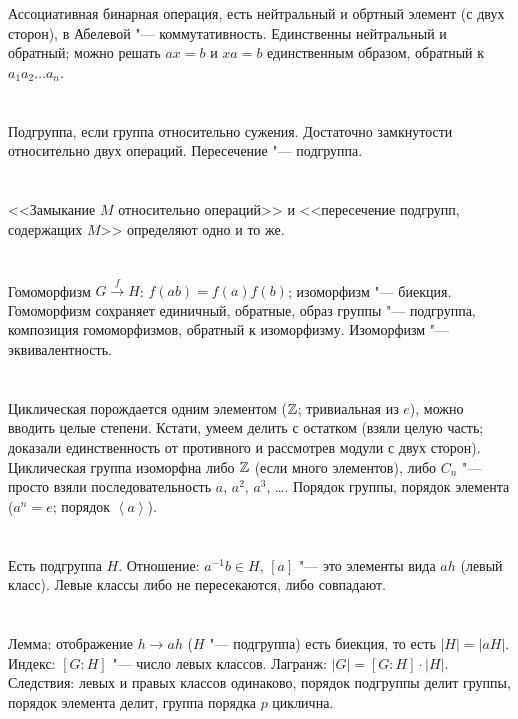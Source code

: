 \section{} %
Ассоциативная бинарная операция, есть нейтральный и обртный элемент (с двух сторон), в Абелевой "--- коммутативность.
Единственны нейтральный и обратный; можно решать $ax=b$ и $xa=b$ единственным образом, обратный к $a_1a_2\dots a_n$.

\section{} %
Подгруппа, если группа относительно сужения. Достаточно замкнутости относительно двух операций. Пересечение "--- подгруппа.

\section{} %
<<Замыкание $M$ относительно операций>> и <<пересечение подгрупп, содержащих $M$>> определяют одно и то же.

\section{} %
Гомоморфизм $G \xrightarrow{f} H$: $f(ab)=f(a)f(b)$; изоморфизм "--- биекция. Гомоморфизм сохраняет единичный, обратные,
образ группы "--- подгруппа, композиция гомоморфизмов, обратный к изоморфизму. Изоморфизм "--- эквивалентность.

\section{} %
Циклическая порождается одним элементом ($\mathbb{Z}$; тривиальная из $e$), можно вводить целые степени.
Кстати, умеем делить с остатком (взяли целую часть; доказали единственность от противного и рассмотрев модули с двух сторон).
Циклическая группа изоморфна либо $\mathbb{Z}$ (если много элементов), либо $C_n$ "--- просто взяли последовательность $a$, $a^2$, $a^3$, \dots.
Порядок группы, порядок элемента ($a^n=e$; порядок $\left<a\right>$).

\section{} %
Есть подгруппа $H$. Отношение: $a^{-1}b \in H$, $[a]$ "--- это элементы вида $ah$ (левый класс). Левые классы либо не пересекаются,
либо совпадают.

\section{} %
Лемма: отображение $h \to ah$ ($H$ "--- подгруппа) есть биекция, то есть $|H|=|aH|$. Индекс: $[G:H]$ "--- число левых классов.
Лагранж: $|G|=[G:H]\cdot|H|$. Следствия: левых и правых классов одинаково, порядок подгруппы делит группы, порядок элемента делит,
группа порядка $p$ циклична.

